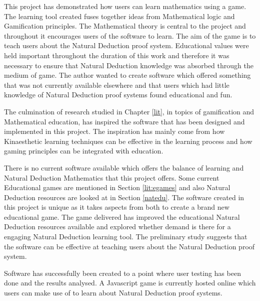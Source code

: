
This project has demonstrated how users can learn mathematics using a game. The learning tool created fuses together ideas from Mathematical logic and Gamification principles. The Mathematical theory is central to the project and throughout it encourages users of the software to learn. The aim of the game is to teach users about the Natural Deduction proof system.  Educational values were held important throughout the duration of this work and therefore it was necessary to ensure that Natural Deduction knowledge was absorbed through the medium of game. The author wanted to create software which offered something that was not currently available elsewhere and that users which had little knowledge of Natural Deduction proof systems found educational and fun.




The culmination of research studied in Chapter \ref{lit}, in topics of gamification and Mathematical education, has inspired the software that has been designed and implemented in this project. The inspiration has mainly come from how Kinaesthetic learning techniques can be effective in the learning process and how gaming principles can be integrated with education.

There is no current software available which offers the balance of learning and Natural Deduction Mathematics that this project offers. Some current Educational games are mentioned in Section \ref{lit:egames} and also Natural Deduction resources are looked at in Section \ref{natedu}. The software created in this project is unique as it takes aspects from both to create a brand new educational game. The game delivered has improved the educational Natural Deduction resources available and explored whether demand is there for a engaging Natural Deduction learning tool. The preliminary study suggests that the software can be effective at teaching users about the Natural Deduction proof system.

Software has successfully been created to a point where user testing has been done and the results analysed. A Javascript game is currently hosted online which users can make use of to learn about Natural Deduction proof systems. 

